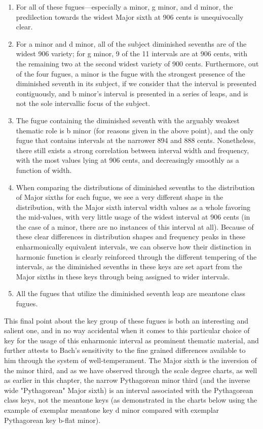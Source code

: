 \begin{enumerate}
\def\labelenumi{\arabic{enumi}.}
\tightlist
\item
  For all of these fugues---especially a minor, g minor, and d
  minor, the predilection towards the widest Major sixth at 906 cents is
  unequivocally clear.
\item
  For a minor and d minor, all of the subject diminished sevenths are of
  the widest 906 variety; for g minor, 9 of the 11 intervals are at 906
  cents, with the remaining two at the second widest variety of 900
  cents. Furthermore, out of the four fugues, a minor is the fugue with
  the strongest presence of the diminished seventh in its subject, if we
  consider that the interval is presented contiguously, and b minor's
  interval is presented in a series of leaps, and is not the sole
  intervallic focus of the subject.
\item
  The fugue containing the diminished seventh with the arguably weakest
  thematic role is b minor (for reasons given in the above point), and
  the only fugue that contains intervals at the narrower 894 and 888
  cents. Nonetheless, there still exists a strong correlation between
  interval width and frequency, with the most values lying at 906 cents,
  and decreasingly smoothly as a function of width.
\item
  When comparing the distributions of diminished sevenths to the
  distribution of Major sixths for each fugue, we see a very different
  shape in the distribution, with the Major sixth interval width values
  as a whole favoring the mid-values, with very little usage of the
  widest interval at 906 cents (in the case of a minor, there are no
  instances of this interval at all). Because of these clear differences
  in distribution shapes and frequency peaks in these enharmonically
  equivalent intervals, we can observe how their distinction in harmonic
  function is clearly reinforced through the different tempering of the
  intervals, as the diminished sevenths in these keys are set apart from
  the Major sixths in these keys through being assigned to wider
  intervals.
\item
  All the fugues that utilize the diminished seventh leap are meantone
  class fugues.
\end{enumerate}

This final point about the key group of these fugues is both an
interesting and salient one, and in no way accidental when it comes to
this particular choice of key for the usage of this enharmonic interval
as prominent thematic material, and further attests to Bach's
sensitivity to the fine grained differences available to him through the
system of well-temperament. The Major sixth is the inversion of the
minor third, and as we have observed through the scale degree charts, as
well as earlier in this chapter, the narrow Pythagorean minor third (and
the inverse wide "Pythagorean" Major sixth) is an interval associated
with the Pythagorean class keys, not the meantone keys (as demonstrated
in the charts below using the example of exemplar meantone key d minor
compared with exemplar Pythagorean key b-flat minor).



